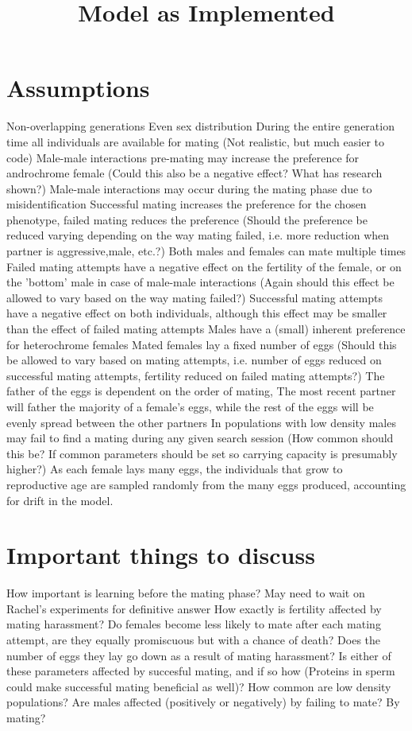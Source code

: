 \documentclass{article}
\title{Model as Implemented}
\date{\vspace{-5ex}}
\begin{document}
\maketitle

\section{Assumptions}
Non-overlapping generations \cite{Svensson2005}
Even sex distribution
During the entire generation time all individuals are available for mating (Not realistic, but much easier to code)
Male-male interactions pre-mating may increase the preference for androchrome female (Could this also be a negative effect? What has research shown?)
Male-male interactions may occur during the mating phase due to misidentification \cite{Blow2019}
Successful mating increases the preference for the chosen phenotype, failed mating reduces the preference (Should the preference be reduced varying depending on the way mating failed, i.e. more reduction when partner is aggressive,male, etc.?)
Both males and females can mate multiple times \cite{Gosden2007}
Failed mating attempts have a negative effect on the fertility of the female, or on the 'bottom' male in case of male-male interactions (Again should this effect be allowed to vary based on the way mating failed?)
Successful mating attempts have a negative effect on both individuals, although this effect may be smaller than the effect of failed mating attempts
Males have a (small) inherent preference for heterochrome females \cite{Blow2019}
Mated females lay a fixed number of eggs (Should this be allowed to vary based on mating attempts, i.e. number of eggs reduced on successful mating attempts, fertility reduced on failed mating attempts?)
The father of the eggs is dependent on the order of mating, The most recent partner will father the majority of a female's eggs, while the rest of the eggs will be evenly spread between the other partners \cite{Cordoba2003}
In populations with low density males may fail to find a mating during any given search session (How common should this be? If common parameters should be set so carrying capacity is presumably higher?)
As each female lays many eggs, the individuals that grow to reproductive age are sampled randomly from the many eggs produced, accounting for drift in the model.

\section{Important things to discuss}
How important is learning before the mating phase? May need to wait on Rachel's experiments for definitive answer
How exactly is fertility affected by mating harassment? Do females become less likely to mate after each mating attempt, are they equally promiscuous but with a chance of death? Does the number of eggs they lay go down as a result of mating harassment? Is either of these parameters affected by succesful mating, and if so how (Proteins in sperm could make successful mating beneficial as well)?
How common are low density populations?
Are males affected (positively or negatively) by failing to mate? By mating?
\end{document}
